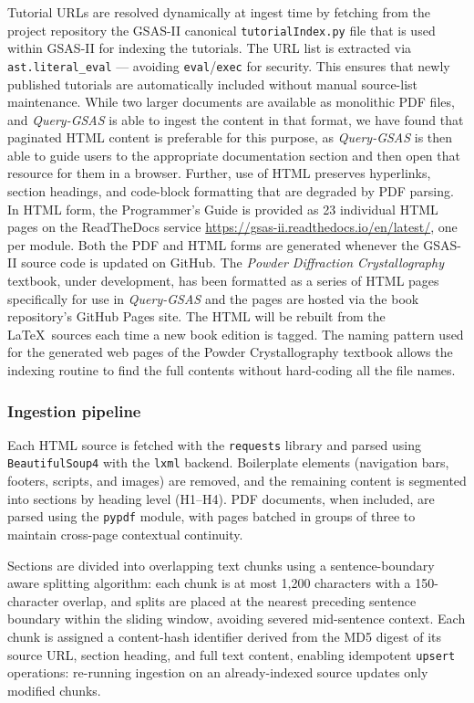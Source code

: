 Tutorial URLs are resolved dynamically at ingest time by fetching from the project
repository the
GSAS-II canonical \texttt{tutorialIndex.py} file that is used within GSAS-II for 
indexing the tutorials. The URL list is extracted via \texttt{ast.literal\_eval}
--- avoiding \texttt{eval}/\texttt{exec} for security.
This ensures that newly published tutorials are automatically included
without manual source-list maintenance. 
While two larger documents are available as monolithic PDF files, and \textit{Query-GSAS} is able to ingest the content in that format, we have found that paginated HTML content is preferable for this purpose, as \textit{Query-GSAS} is then able to guide users to the appropriate documentation section and then open that resource for them in a browser. Further, use of HTML preserves hyperlinks, section
headings, and code-block formatting that are degraded by PDF parsing.
In HTML form, the Programmer's Guide is provided as 23 individual HTML pages on the ReadTheDocs service
\url{https://gsas-ii.readthedocs.io/en/latest/}, one per module. Both the PDF and HTML forms are generated whenever the GSAS-II source code is updated on GitHub.
The \textit{Powder Diffraction Crystallography} textbook\citep{toby2024book}, under development, has been formatted as a series of HTML pages specifically for use in \textit{Query-GSAS} and the pages are hosted via the book repository's GitHub Pages site.
The HTML will be rebuilt from the \LaTeX\ sources each time a new book edition is tagged.
The naming pattern used for the generated web pages of the Powder Crystallography textbook allows the indexing routine to find the full contents without hard-coding all the file names. 

\subsubsection{Ingestion pipeline}

Each HTML source is fetched with the \texttt{requests} library and
parsed using \texttt{BeautifulSoup4} with the \texttt{lxml} backend.
Boilerplate elements (navigation bars, footers, scripts, and images)
are removed, and the remaining content is segmented into sections by
heading level (H1--H4).
PDF documents, when included, are parsed using the \texttt{pypdf} module, with pages
batched in groups of three to maintain cross-page contextual continuity.

Sections are divided into overlapping text chunks using a
sentence-boundary aware splitting algorithm: each chunk is at most
1{,}200 characters with a 150-character overlap, and splits are
placed at the nearest preceding sentence boundary within the
sliding window, avoiding severed mid-sentence context.
Each chunk is assigned a content-hash identifier derived from the
MD5 digest of its source URL, section heading, and full text content,
enabling idempotent \texttt{upsert} operations: re-running ingestion
on an already-indexed source updates only modified chunks.

